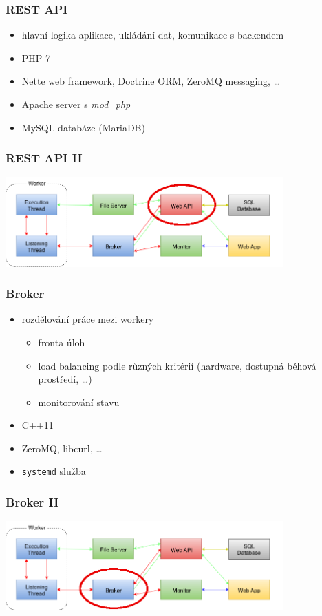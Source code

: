 \documentclass{beamer}
\begin{document}
\begin{frame}
	\frametitle{REST API}
	\begin{itemize}
		\item hlavní logika aplikace, ukládání dat, komunikace s backendem
		\item PHP 7
		\item Nette web framework, Doctrine ORM, ZeroMQ messaging, \dots
		\item Apache server s {\it mod\_php}
		\item MySQL databáze (MariaDB)
	\end{itemize}
\end{frame}

\begin{frame}
	\frametitle{REST API II}
	\begin{center}
		\includegraphics[width=0.8\textwidth]{images/communication-webapi.png}
	\end{center}
\end{frame}

\begin{frame}
	\frametitle{Broker}
	\begin{itemize}
		\item rozdělování práce mezi workery
			\begin{itemize}
				\item fronta úloh
				\item load balancing podle různých kritérií (hardware, dostupná běhová prostředí, \dots)
				\item monitorování stavu
			\end{itemize}
		\item C++11
		\item ZeroMQ, libcurl, \dots
		\item \texttt{systemd} služba
	\end{itemize}
\end{frame}

\begin{frame}
	\frametitle{Broker II}
	\begin{center}
		\includegraphics[width=0.8\textwidth]{images/communication-broker.png}
	\end{center}
\end{frame}
\end{document}

